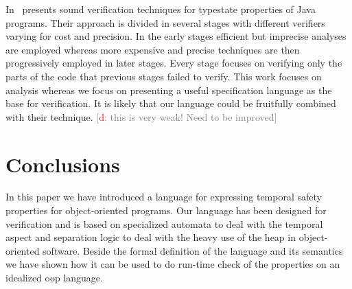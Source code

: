 \documentclass[preprint]{sigplanconf} %
\newcommand{\note}[2]{\textcolor{gray}{[\textcolor{red}{#1}: #2]}}
\newcommand{\dd}[1]{\note{d}{#1}}
\newcommand{\dinocomment}[1]{\dd{#1}}
\theoremstyle{definition}
\begin{document}
In~\cite{FinkelEtAl} presents sound verification techniques for typestate properties of Java  programs.
Their approach is divided in several stages with different verifiers varying for cost and precision.
In the early stages efficient but imprecise analyses are employed whereas 
more expensive and precise techniques are then progressively employed in later stages.
Every stage focuses on verifying only the parts of the code that previous stages failed to verify.
This work focuses on analysis whereas we focus on presenting a useful specification language as the base for verification.
It is likely that our language could be fruitfully combined with their technique.
\dinocomment{this is very weak! Need to be improved} 

\section{Conclusions}\label{sec:conclusions} %
In this paper we have introduced a language for expressing temporal safety properties for object-oriented programs.
Our language has been designed for verification and is based on specialized automata to deal with the temporal aspect and separation logic to deal with the  heavy use of the heap in object-oriented software. 
Beside the formal definition of the language and its semantics we have shown how it can be used to do run-time check of the properties 
on an idealized oop language.



\softraggedright


\end{document}
